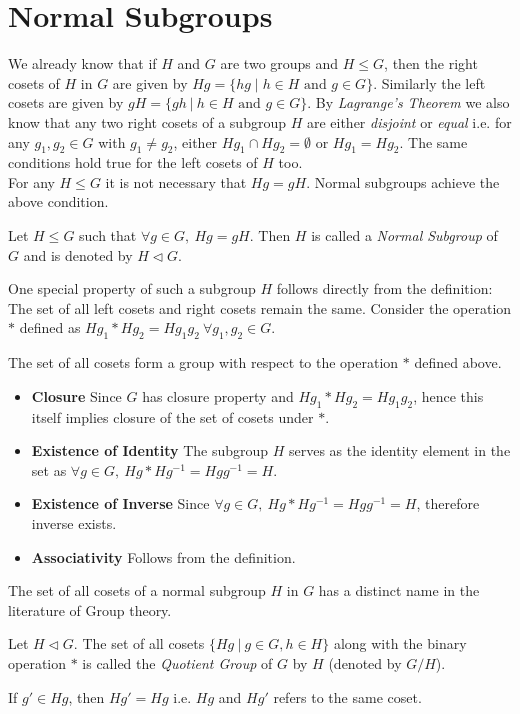 \section{Normal Subgroups}
We already know that if $H$ and $G$ are two groups and $H\leq G$, then the right cosets of $H$ in $G$ are given by $Hg = \{hg\mid h\in H\text{ and }g\in G\}$. Similarly the left cosets are given by $gH = \{gh~|~h\in H\text{ and }g\in G\}$. By \emph{Lagrange's Theorem} we also know that any two right cosets of a subgroup $H$ are either \emph{disjoint} or \emph{equal} i.e. for any $g_1,g_2\in G$ with $g_1\neq g_2$, either $Hg_1\cap Hg_2 = \emptyset$ or $Hg_1 = Hg_2$. The same conditions hold true for the left cosets of $H$ too.\\
For any $H\leq G$ it is not necessary that $Hg = gH$.  Normal subgroups achieve the above condition. 
\begin{definition}
	Let $H\leq G$ such that $\forall g\in G,~Hg = gH.$ Then $H$ is called a {\em Normal Subgroup} of $G$ and is denoted by $H\triangleleft G$.
\end{definition}
One special property of such a subgroup $H$ follows directly from the definition: The set of all left cosets and right cosets remain the same. Consider the operation $*$ defined as $Hg_1*Hg_2 = Hg_1g_2~\forall g_1,g_2\in G$.
\begin{observation}
The set of all cosets form a group with respect to the operation $*$ defined above.
\begin{itemize}
	\item {\bf Closure} Since $G$ has closure property and $Hg_1*Hg_2 = Hg_1g_2$, hence this itself implies closure of the set of cosets under $*$.
	\item {\bf Existence of Identity} The subgroup $H$ serves as the identity element in the set as $\forall g\in G,~Hg*Hg^{-1} = Hgg^{-1}=H$.
	\item {\bf Existence of Inverse} Since $\forall g\in G,~Hg*Hg^{-1} = Hgg^{-1} = H$, therefore inverse exists.
	\item {\bf Associativity} Follows from the definition.
\end{itemize}
\end{observation}
The set of all cosets of a normal subgroup $H$ in $G$ has a distinct name in the literature of Group theory. 
\begin{definition}\label{QG}
	Let $H\triangleleft G$. The set of all cosets $\{Hg~|~g\in G, h\in H\}$ along with the binary operation $*$ is called the {\em Quotient Group} of $G$ by $H$ (denoted by $G/H$).
\end{definition}
If $g'\in Hg$, then $Hg' = Hg$ i.e. $Hg$ and $Hg'$ refers to the same coset. 

